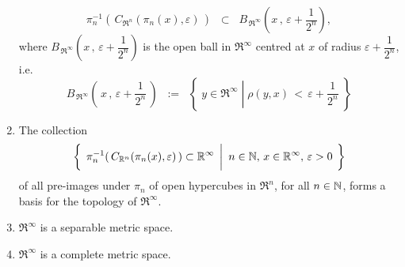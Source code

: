\begin{theorem}
\begin{enumerate}
		\begin{equation*}
		\pi_{n}^{-1}\!\left(\,C_{\Re^{n}}(\pi_{n}(x),\varepsilon)\,\right)
		\;\;\subset\;\;
		B_{\mbox{}\,\Re^{\infty}}\!\left(x\,,\,\varepsilon + \frac{1}{2^{n}}\right),
		\end{equation*}
		where $B_{\mbox{}\,\Re^{\infty}}\!\left(x\,,\,\varepsilon + \dfrac{1}{2^{n}}\right)$
		is the open ball in $\Re^{\infty}$ centred at $x$ of radius $\varepsilon + \dfrac{1}{2^{n}}$, i.e.
		\begin{equation*}
		B_{\mbox{}\,\Re^{\infty}}\!\left(\,x\,,\,\varepsilon + \frac{1}{2^{n}}\,\right)
		\;\; := \;\;
		\left\{\;
		y \in \Re^{\infty}
		\;\left\vert\;
		\rho(y,x) \,<\, \varepsilon + \frac{1}{2^{n}}
		\right.
		\;\right\}
		\end{equation*}
\item	The collection
		\begin{equation*}
		\left\{\;\,
		\pi_{n}^{-1}\!\left(\,C_{\Re^{n}}(\pi_{n}(x),\varepsilon)\,\right) \subset \Re^{\infty}
		\;\left\vert
		{\color{white}\overset{1}{1}}
		n \in \N,\,x \in \Re^{\infty},\,\varepsilon > 0
		\right.
		\;\right\}
		\end{equation*}
		of all pre-images under $\pi_{n}$ of open hypercubes in $\Re^{n}$, for all $n \in \mathbb{N}$,
		forms a basis for the topology of $\Re^{\infty}$.
\item	$\Re^{\infty}$ is a separable metric space.
\item	$\Re^{\infty}$ is a complete metric space.
\end{enumerate}
\end{theorem}

